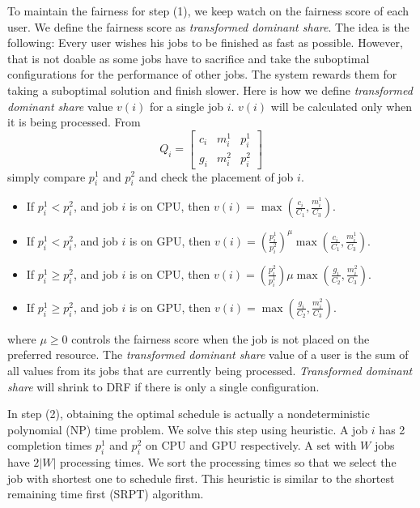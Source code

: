 To maintain the fairness for step (1), we keep watch on the fairness score of each user.
We define the fairness score as \textit{transformed dominant share}.
The idea is the following: Every user wishes his jobs to be finished as fast as possible.
However, that is not doable as some jobs have to sacrifice and take the suboptimal configurations for the performance of other jobs.
The system rewards them for taking a suboptimal solution and finish slower.
Here is how we define \textit{transformed dominant share} value $v(i)$ for a single job $i$. $v(i)$ will be calculated only when it is being processed.
From $$
	Q_i=
	\begin{bmatrix}
	c_i & m_i^1 & p_i^1 \\
	g_i & m_i^2 & p_i^2 
	\end{bmatrix} $$ simply compare $p_i^1$ and $p_i^2$ and check the placement of job $i$. \begin{itemize}
		\item If $p_i^1 <  p_i^2$, and job $i$ is on CPU, then $v(i) = \max(\frac{c_i}{C_1},\frac{m_i^1}{C_3})$.
		\item If $p_i^1 <  p_i^2$, and job $i$ is on GPU, then $v(i) =  (\frac{p_i^1}{p_i^2})^\mu \max(\frac{c_i}{C_1},\frac{m_i^1}{C_3})$.
		\item If $p_i^1 \geq  p_i^2$, and job $i$ is on CPU, then $v(i) =  (\frac{p_i^2}{p_i^1})\mu \max(\frac{g_i}{C_2},\frac{m_i^2}{C_3})$.
		\item If $p_i^1 \geq  p_i^2$, and job $i$ is on GPU, then $v(i) = \max(\frac{g_i}{C_2},\frac{m_i^2}{C_3})$.
	\end{itemize} 
where $\mu \geq 0 $ controls the fairness score when the job is not placed on the preferred resource.
The \textit{transformed dominant share} value of a user is the sum of all values from its jobs that are currently being processed.
\textit{Transformed dominant share} will shrink to DRF if there is only a single configuration.

In step (2), obtaining the optimal schedule is actually a nondeterministic polynomial (NP) time problem. 
We solve this step using heuristic.
A job $i$ has 2 completion times $p^1_i$ and $p^2_i$ on CPU and GPU respectively.
A set with $W$ jobs have $2|W|$ processing times.
We sort the processing times so that we select the job with shortest one to schedule first.
This heuristic is similar to the shortest remaining time first (SRPT) algorithm.
